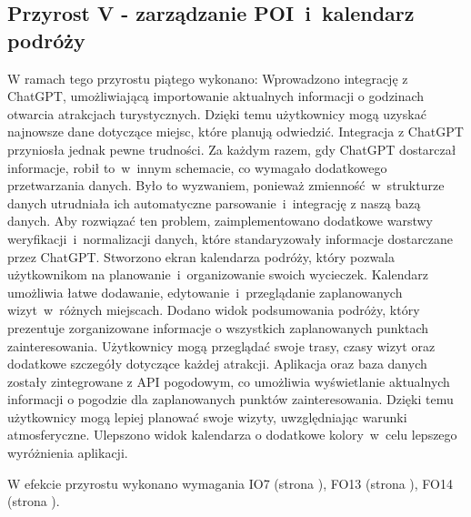     \subsection{Przyrost V - zarządzanie POI~i~kalendarz podróży}
    \label{sec:przyrost5}

    W ramach tego przyrostu piątego wykonano:
    Wprowadzono integrację z ChatGPT, umożliwiającą importowanie aktualnych informacji o godzinach otwarcia atrakcjach turystycznych. 
    Dzięki temu użytkownicy mogą uzyskać najnowsze dane dotyczące miejsc, które planują odwiedzić.\newline
    \indent Integracja z ChatGPT przyniosła jednak pewne trudności. Za każdym razem, gdy ChatGPT dostarczał informacje, robił to~w~innym schemacie, 
    co wymagało dodatkowego przetwarzania danych. Było to wyzwaniem, ponieważ zmienność~w~strukturze danych utrudniała ich automatyczne parsowanie~i~integrację z naszą bazą danych. \newline 
    \indent Aby rozwiązać ten problem, zaimplementowano dodatkowe warstwy weryfikacji~i~normalizacji danych, które standaryzowały informacje dostarczane przez ChatGPT.\newline
    \indent Stworzono ekran kalendarza podróży, który pozwala użytkownikom na planowanie~i~organizowanie swoich wycieczek.
    Kalendarz umożliwia łatwe dodawanie, edytowanie~i~przeglądanie zaplanowanych wizyt~w~różnych miejscach.\newline
    \indent Dodano widok podsumowania podróży, który prezentuje zorganizowane informacje o wszystkich zaplanowanych punktach zainteresowania. 
    Użytkownicy mogą przeglądać swoje trasy, czasy wizyt oraz dodatkowe szczegóły dotyczące każdej atrakcji. \newline
    \indent Aplikacja oraz baza danych zostały zintegrowane z API pogodowym, co umożliwia wyświetlanie aktualnych informacji o pogodzie dla zaplanowanych punktów zainteresowania. 
    Dzięki temu użytkownicy mogą lepiej planować swoje wizyty, uwzględniając warunki atmosferyczne. \newline
    Ulepszono widok kalendarza o dodatkowe kolory~w~celu lepszego wyróżnienia aplikacji. 

    W efekcie przyrostu wykonano wymagania IO7 (strona \pageref{tab:requirements:env7}), FO13 (strona \pageref{tab:requirements:func13}), FO14 (strona \pageref{tab:requirements:func14}).

